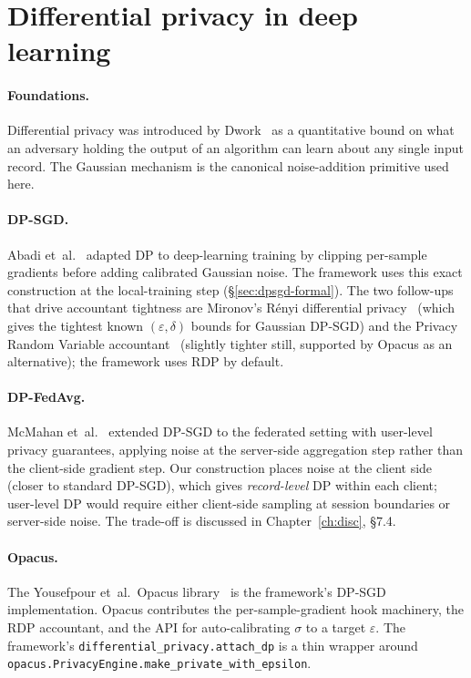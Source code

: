 \documentclass[11pt,a4paper]{report}
\begin{document}
\section{Differential privacy in deep learning}\label{sec:rw-dp}

\paragraph{Foundations.} Differential privacy was introduced by
Dwork~\cite{dwork2006dp} as a quantitative bound on what an adversary
holding the output of an algorithm can learn about any single input
record. The Gaussian mechanism is the canonical noise-addition primitive
used here.

\paragraph{DP-SGD.} Abadi et~al.~\cite{abadi2016dpsgd} adapted DP to
deep-learning training by clipping per-sample gradients before adding
calibrated Gaussian noise. The framework uses this exact construction at
the local-training step (\S\ref{sec:dpsgd-formal}). The two follow-ups
that drive accountant tightness are Mironov's Rényi differential
privacy~\cite{mironov2017rdp} (which gives the tightest known
$(\varepsilon, \delta)$ bounds for Gaussian DP-SGD) and the Privacy Random
Variable accountant~\cite{gopi2021prv} (slightly tighter still, supported
by Opacus as an alternative); the framework uses RDP by default.

\paragraph{DP-FedAvg.} McMahan et~al.~\cite{mcmahan2018dpfedavg} extended
DP-SGD to the federated setting with user-level privacy guarantees,
applying noise at the server-side aggregation step rather than the
client-side gradient step. Our construction places noise at the client
side (closer to standard DP-SGD), which gives \emph{record-level} DP
within each client; user-level DP would require either client-side
sampling at session boundaries or server-side noise. The trade-off is
discussed in Chapter~\ref{ch:disc}, \S7.4.

\paragraph{Opacus.} The Yousefpour et~al.\ Opacus
library~\cite{yousefpour2021opacus} is the framework's DP-SGD
implementation. Opacus contributes the per-sample-gradient hook
machinery, the RDP accountant, and the API for auto-calibrating $\sigma$
to a target $\varepsilon$. The framework's
\texttt{differential\_privacy.attach\_dp} is a thin wrapper around
\texttt{opacus.PrivacyEngine.make\_private\_with\_epsilon}.
\end{document}

